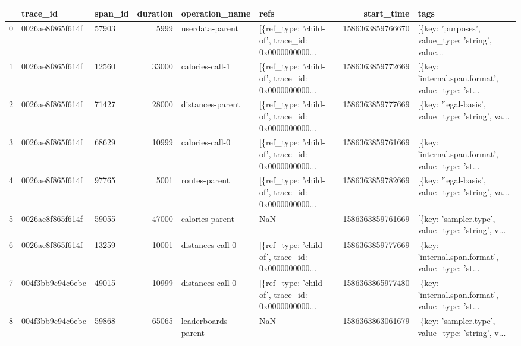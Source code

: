 \begin{tabular}{lllrllrl}
\toprule
{} &          trace\_id & span\_id &  duration &       operation\_name &                                               refs &        start\_time &                                               tags \\
\midrule
0 &  0026ae8f865f614f &   57903 &      5999 &      userdata-parent &  [\{ref\_type: 'child-of', trace\_id: 0x0000000000... &  1586363859766670 &  [\{key: 'purposes', value\_type: 'string', value... \\
1 &  0026ae8f865f614f &   12560 &     33000 &      calories-call-1 &  [\{ref\_type: 'child-of', trace\_id: 0x0000000000... &  1586363859772669 &  [\{key: 'internal.span.format', value\_type: 'st... \\
2 &  0026ae8f865f614f &   71427 &     28000 &     distances-parent &  [\{ref\_type: 'child-of', trace\_id: 0x0000000000... &  1586363859777669 &  [\{key: 'legal-basis', value\_type: 'string', va... \\
3 &  0026ae8f865f614f &   68629 &     10999 &      calories-call-0 &  [\{ref\_type: 'child-of', trace\_id: 0x0000000000... &  1586363859761669 &  [\{key: 'internal.span.format', value\_type: 'st... \\
4 &  0026ae8f865f614f &   97765 &      5001 &        routes-parent &  [\{ref\_type: 'child-of', trace\_id: 0x0000000000... &  1586363859782669 &  [\{key: 'legal-basis', value\_type: 'string', va... \\
5 &  0026ae8f865f614f &   59055 &     47000 &      calories-parent &                                                NaN &  1586363859761669 &  [\{key: 'sampler.type', value\_type: 'string', v... \\
6 &  0026ae8f865f614f &   13259 &     10001 &     distances-call-0 &  [\{ref\_type: 'child-of', trace\_id: 0x0000000000... &  1586363859777669 &  [\{key: 'internal.span.format', value\_type: 'st... \\
7 &  004f3bb9c94c6ebc &   49015 &     10999 &     distances-call-0 &  [\{ref\_type: 'child-of', trace\_id: 0x0000000000... &  1586363865977480 &  [\{key: 'internal.span.format', value\_type: 'st... \\
8 &  004f3bb9c94c6ebc &   59868 &     65065 &  leaderboards-parent &                                                NaN &  1586363863061679 &  [\{key: 'sampler.type', value\_type: 'string', v... \\
\bottomrule
\end{tabular}
